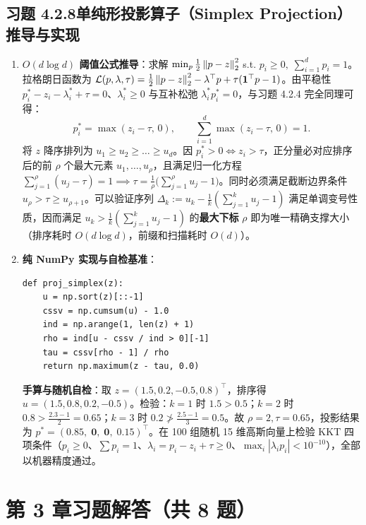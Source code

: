 \subsection*{习题 4.2.8\quad 单纯形投影算子（Simplex Projection）推导与实现}
\begin{enumerate}[label=(\arabic*), leftmargin=1.8em]
  \item \textbf{$O(d\log d)$ 阈值公式推导}：求解 $\min_p \frac{1}{2}\left\|p - z\right\|_2^2$ s.t. $p_i \ge 0,\; \sum_{i=1}^d p_i = 1$。拉格朗日函数为 $\mathcal{L}(p, \lambda, \tau) = \frac{1}{2}\left\|p - z\right\|_2^2 - \lambda^\top p + \tau(\mathbf{1}^\top p - 1)$。由平稳性 $p_i^* - z_i - \lambda_i^* + \tau = 0$、$\lambda_i^* \ge 0$ 与互补松弛 $\lambda_i^* p_i^* = 0$，与习题 4.2.4 完全同理可得：
  \[
    p_i^* = \max(z_i - \tau,\, 0), \qquad \sum_{i=1}^d \max(z_i - \tau,\, 0) = 1.
  \]
  将 $z$ 降序排列为 $u_1 \ge u_2 \ge \dots \ge u_d$。因 $p_i^* > 0 \iff z_i > \tau$，正分量必对应排序后的前 $\rho$ 个最大元素 $u_1, \dots, u_\rho$，且满足归一化方程 $\sum_{j=1}^\rho (u_j - \tau) = 1 \implies \tau = \frac{1}{\rho}\big(\sum_{j=1}^\rho u_j - 1\big)$。同时必须满足截断边界条件 $u_\rho > \tau \ge u_{\rho+1}$。可以验证序列 $\Delta_k := u_k - \frac{1}{k}(\sum_{j=1}^k u_j - 1)$ 满足单调变号性质，因而满足 $u_k > \frac{1}{k}(\sum_{j=1}^k u_j - 1)$ 的\textbf{最大下标} $\rho$ 即为唯一精确支撑大小（排序耗时 $O(d\log d)$，前缀和扫描耗时 $O(d)$）。

  \item \textbf{纯 NumPy 实现与自检基准}：
  \begin{lstlisting}
def proj_simplex(z):
    u = np.sort(z)[::-1]
    cssv = np.cumsum(u) - 1.0
    ind = np.arange(1, len(z) + 1)
    rho = ind[u - cssv / ind > 0][-1]
    tau = cssv[rho - 1] / rho
    return np.maximum(z - tau, 0.0)
  \end{lstlisting}
  \textbf{手算与随机自检}：取 $z = (1.5, 0.2, -0.5, 0.8)^\top$，排序得 $u = (1.5, 0.8, 0.2, -0.5)$。检验：$k=1$ 时 $1.5 > 0.5$；$k=2$ 时 $0.8 > \frac{2.3-1}{2} = 0.65$；$k=3$ 时 $0.2 \not> \frac{2.5-1}{3} = 0.5$。故 $\rho = 2, \tau = 0.65$，投影结果为 $p^* = \mathbf{(0.85,\; 0,\; 0,\; 0.15)^\top}$。在 100 组随机 15 维高斯向量上检验 KKT 四项条件（$p_i \ge 0$、$\sum p_i = 1$、$\lambda_i = p_i - z_i + \tau \ge 0$、$\max_i |\lambda_i p_i| < 10^{-10}$），全部以机器精度通过。
\end{enumerate}

\section*{第 3 章习题解答（共 8 题）}

